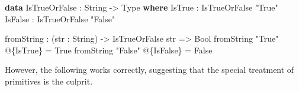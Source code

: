 \documentclass[
]{article}
\newenvironment{Shaded}{}{}
\newcommand{\DataTypeTok}[1]{\textcolor[rgb]{0.56,0.13,0.00}{#1}}
\newcommand{\KeywordTok}[1]{\textcolor[rgb]{0.00,0.44,0.13}{\textbf{#1}}}
\newcommand{\NormalTok}[1]{#1}
\newcommand{\OperatorTok}[1]{\textcolor[rgb]{0.40,0.40,0.40}{#1}}
\newcommand{\OtherTok}[1]{\textcolor[rgb]{0.00,0.44,0.13}{#1}}
\newcommand{\StringTok}[1]{\textcolor[rgb]{0.25,0.44,0.63}{#1}}
\begin{document}
\begin{Shaded}
\begin{Highlighting}[]
\KeywordTok{data} \DataTypeTok{IsTrueOrFalse} \OperatorTok{:} \DataTypeTok{String} \OtherTok{{-}\textgreater{}} \DataTypeTok{Type} \KeywordTok{where}
  \DataTypeTok{IsTrue} \OperatorTok{:} \DataTypeTok{IsTrueOrFalse} \StringTok{"True"}
  \DataTypeTok{IsFalse} \OperatorTok{:} \DataTypeTok{IsTrueOrFalse} \StringTok{"False"}

\NormalTok{fromString }\OperatorTok{:}\NormalTok{ (str }\OperatorTok{:} \DataTypeTok{String}\NormalTok{) }\OtherTok{{-}\textgreater{}} \DataTypeTok{IsTrueOrFalse}\NormalTok{ str }\OtherTok{=\textgreater{}} \DataTypeTok{Bool}
\NormalTok{fromString }\StringTok{"True"} \OperatorTok{@}\NormalTok{\{}\DataTypeTok{IsTrue}\NormalTok{\} }\OtherTok{=} \DataTypeTok{True}
\NormalTok{fromString }\StringTok{"False"} \OperatorTok{@}\NormalTok{\{}\DataTypeTok{IsFalse}\NormalTok{\} }\OtherTok{=} \DataTypeTok{False}
\end{Highlighting}
\end{Shaded}

However, the following works correctly, suggesting that the special
treatment of primitives is the culprit.
\end{document}
